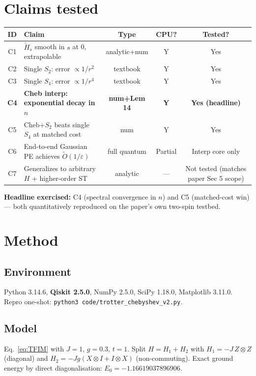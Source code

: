 \documentclass[11pt]{article}
\begin{document}
\section{Claims tested}
\begin{table}[h]
\centering
\small
\begin{tabular}{clccc}
\toprule
ID & Claim & Type & CPU? & Tested? \\
\midrule
C1 & $\tilde{H}_s$ smooth in $s$ at 0, extrapolable & analytic+num & Y & Yes \\
C2 & Single $S_2$: error $\propto 1/r^{2}$ & textbook & Y & Yes \\
C3 & Single $S_4$: error $\propto 1/r^{4}$ & textbook & Y & Yes \\
\textbf{C4} & \textbf{Cheb interp: exponential decay in $n$} & \textbf{num+Lem 14} & \textbf{Y} & \textbf{Yes (headline)} \\
C5 & Cheb+$S_2$ beats single $S_4$ at matched cost & num & Y & Yes \\
C6 & End-to-end Gaussian PE achieves $\widetilde{O}(1/\varepsilon)$ & full quantum & Partial & Interp core only \\
C7 & Generalizes to arbitrary $H$ + higher-order ST & analytic & --- & Not tested (matches paper Sec 5 scope) \\
\bottomrule
\end{tabular}
\end{table}

\textbf{Headline exercised:} C4 (spectral convergence in $n$) and C5
(matched-cost win) --- both quantitatively reproduced on the paper's own
two-spin testbed.

\section{Method}
\subsection{Environment}
Python 3.14.6, \textbf{Qiskit 2.5.0}, NumPy 2.5.0, SciPy 1.18.0, Matplotlib 3.11.0.
Repro one-shot: \texttt{python3 code/trotter\_chebyshev\_v2.py}.

\subsection{Model}
Eq.~\eqref{eq:TFIM} with $J=1$, $g=0.3$, $t=1$. Split
$H = H_1 + H_2$ with $H_1 = -J\,Z\otimes Z$ (diagonal) and
$H_2 = -Jg(X\otimes I + I\otimes X)$ (non-commuting). Exact ground energy
by direct diagonalisation: $E_0 = -1.16619037896906$.
\end{document}
